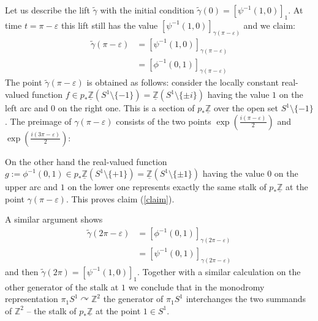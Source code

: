 \documentclass[10pt]{amsart}
\theoremstyle{definition}
\theoremstyle{plain}
\theoremstyle{remark}
\newcommand{\Z}{\mathbb{Z}}
\begin{document}

\vspace{1cm}

Let us describe the lift $\tilde{\gamma}$ with the initial condition $\tilde{\gamma}(0)=[\psi^{-1}(1,0)]_1$. At time $t=\pi-\varepsilon$ this lift still has the value $[\psi^{-1}(1,0)]_{\gamma(\pi-\varepsilon)}$ and we claim:
\begin{align}
\tilde{\gamma}(\pi-\varepsilon)&=[\psi^{-1}(1,0)]_{\gamma(\pi-\varepsilon)}\\
&=[\phi^{-1}(0,1)]_{\gamma(\pi-\varepsilon)}\label{claim}
\end{align}
The point $\tilde{\gamma}(\pi-\varepsilon)$ is obtained as follows: consider the locally constant real-valued function $f\in p_*\underline{\Z}(S^1\setminus\{-1\})=\underline{\Z}(S^1\setminus\{\pm i\})$ having the value $1$ on the left arc and $0$ on the right one. This is a section of $p_*\underline{\Z}$ over the open set $S^1\setminus\{-1\}$. The preimage of $\gamma(\pi-\varepsilon)$ consists of the two points $\exp\left(\frac{i(\pi-\varepsilon)}{2}\right)$ and $\exp\left(\frac{i(3\pi-\varepsilon)}{2}\right)$:\vspace{1cm}
\newline
On the other hand the real-valued function $g:=\phi^{-1}(0,1)\in p_*\underline{\Z}(S^1\setminus\{+1\})=\underline{\Z}(S^1\setminus\{\pm 1\})$ having the value $0$ on the upper arc and $1$ on the lower one represents exactly the same stalk of $p_*\underline{\Z}$ at the point $\gamma(\pi-\varepsilon)$. This proves claim (\ref{claim}).

A similar argument shows
\begin{align*}
\tilde{\gamma}(2\pi-\varepsilon)&=[\phi^{-1}(0,1)]_{\gamma(2\pi-\varepsilon)}\\
&=[\psi^{-1}(0,1)]_{\gamma(2\pi-\varepsilon)}
\end{align*}
and then $\tilde{\gamma}(2\pi)=[\psi^{-1}(1,0)]_1$. Together with a similar calculation on the other generator of the stalk at $1$ we conclude that in the monodromy representation $\pi_1S^1\curvearrowright\Z^2$ the generator of $\pi_1S^1$ interchanges the two summands of $\Z^2$ -- the stalk of $p_*\underline{\Z}$ at the point $1\in S^1$.
\end{document}
